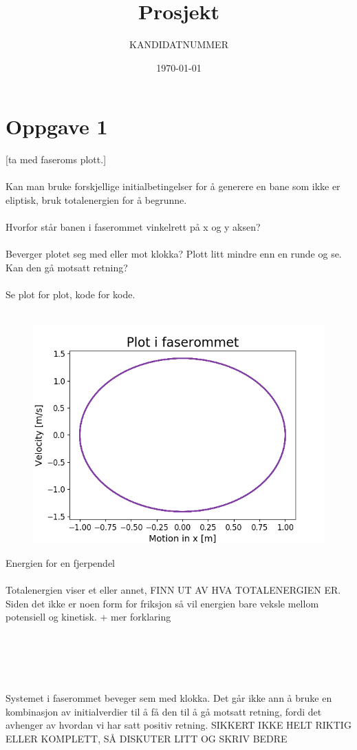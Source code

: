 \documentclass[norsk,a4paper,12pt]{article}
\title{Prosjekt}
\author{KANDIDATNUMMER}
\date{\today}
\begin{document}
\maketitle


\section*{Oppgave 1}
[ta med faseroms plott.]
\\
\\
Kan man bruke forskjellige initialbetingelser for å generere en bane som ikke er eliptisk, bruk totalenergien for å begrunne.
\\
\\
Hvorfor står banen i faserommet vinkelrett på x og y aksen?
\\
\\
Beverger plotet seg med eller mot klokka? Plott litt mindre enn en runde og se. Kan den gå motsatt retning?
\\
\\


Se plot for plot, kode for kode.
\\
\\
\begin{figure}[H]
\includegraphics[scale=0.8]{Oppgave1.png}
\end{figure}


Energien for en fjerpendel
\\
\\
Totalenergien viser et eller annet, FINN UT AV HVA TOTALENERGIEN ER. Siden det ikke er noen form for friksjon så vil energien bare veksle mellom potensiell og kinetisk. + mer forklaring
\\
\\
\\
\\
\\
\\
Systemet i faserommet beveger sem med klokka. Det går ikke ann å bruke en kombinasjon av initialverdier til å få den til å gå motsatt retning, fordi det avhenger av hvordan vi har satt positiv retning.  SIKKERT IKKE HELT RIKTIG ELLER KOMPLETT, SÅ DISKUTER LITT OG SKRIV BEDRE
\end{document}
